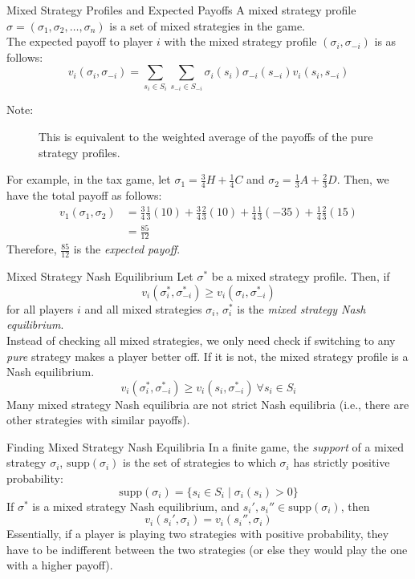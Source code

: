 \documentclass[10pt]{extarticle}
\begin{document}
  \begin{problem}{Mixed Strategy Profiles and Expected Payoffs}
    A mixed strategy profile $\sigma = (\sigma_1,\sigma_2,\dots,\sigma_n)$ is a set of mixed strategies in the game.\\

    The expected payoff to player $i$ with the mixed strategy profile $(\sigma_i, \sigma_{-i})$ is as follows:
    \[
      v_i(\sigma_i,\sigma_{-i}) = \sum_{s_i\in S_i}\sum_{s_{-i}\in S_{-i}}\sigma_i(s_i)\sigma_{-i}(s_{-i})v_i(s_i,s_{-i})
    \] 
    \begin{description}
      \item[Note:] This is equivalent to the weighted average of the payoffs of the pure strategy profiles.
    \end{description}
    For example, in the tax game, let $\sigma_1 = \frac{3}{4}H + \frac{1}{4}C$ and $\sigma_2 = \frac{1}{3}A + \frac{2}{3}D$. Then, we have the total payoff as follows:
    \begin{align*}
      v_1(\sigma_1,\sigma_2) &= \frac{3}{4}\frac{1}{3}(10) + \frac{3}{4}\frac{2}{3}(10) + \frac{1}{4}\frac{1}{3}(-35) + \frac{1}{4}\frac{2}{3}(15)\\
                             &= \frac{85}{12}
    \end{align*}
    Therefore, $\frac{85}{12}$ is the \textit{expected payoff}.
  \end{problem}
  \begin{problem}{Mixed Strategy Nash Equilibrium}
    Let $\sigma^*$ be a mixed strategy profile. Then, if
    \[
      v_i(\sigma^*_i,\sigma^*_{-i}) \geq v_i(\sigma_i,\sigma^*_{-i})
    \] 
    for all players $i$ and all mixed strategies $\sigma_i$, $\sigma^*_i$ is the \textit{mixed strategy Nash equilibrium}.\\

    Instead of checking all mixed strategies, we only need check if switching to any \textit{pure} strategy makes a player better off. If it is not, the mixed strategy profile is a Nash equilibrium.
    \[
      v_i(\sigma^*_i,\sigma^*_{-i}) \geq v_i(s_i,\sigma^*_{-i})~\forall s_i\in S_i
    \] 
    Many mixed strategy Nash equilibria are not strict Nash equilibria (i.e., there are other strategies with similar payoffs).
  \end{problem}
  \begin{problem}{Finding Mixed Strategy Nash Equilibria}
    In a finite game, the \textit{support} of a mixed strategy $\sigma_i$, $\text{supp}(\sigma_i)$ is the set of strategies to which $\sigma_i$ has strictly positive probability:
    \[
      \text{supp}(\sigma_i) = \{s_i\in S_i \mid \sigma_i(s_i) > 0\}
    \]
    If $\sigma^*$ is a mixed strategy Nash equilibrium, and $s_i',s_i'' \in \text{supp}(\sigma_i)$, then
    \[
      v_i(s_i',\sigma_i) = v_i(s_i'',\sigma_i)
    \] 
    Essentially, if a player is playing two strategies with positive probability, they have to be indifferent between the two strategies (or else they would play the one with a higher payoff).
  \end{problem}
\end{document}
